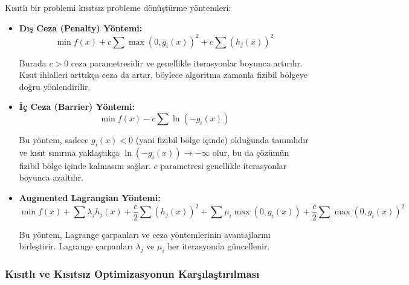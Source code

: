 \begin{tcolorbox}[title=Kısıtların Ele Alınması]
Kısıtlı bir problemi kısıtsız probleme dönüştürme yöntemleri:

\begin{itemize}
    \item \textbf{Dış Ceza (Penalty) Yöntemi:} 
    \begin{equation}
    \min f(x) + c\sum\max(0,g_i(x))^2 + c\sum(h_j(x))^2
    \end{equation}
    
    Burada $c > 0$ ceza parametresidir ve genellikle iterasyonlar boyunca artırılır. Kısıt ihlalleri arttıkça ceza da artar, böylece algoritma zamanla fizibil bölgeye doğru yönlendirilir.
    
    \item \textbf{İç Ceza (Barrier) Yöntemi:} 
    \begin{equation}
    \min f(x) - c\sum\ln(-g_i(x))
    \end{equation}
    
    Bu yöntem, sadece $g_i(x) < 0$ (yani fizibil bölge içinde) olduğunda tanımlıdır ve kısıt sınırına yaklaştıkça $\ln(-g_i(x)) \to -\infty$ olur, bu da çözümün fizibil bölge içinde kalmasını sağlar. $c$ parametresi genellikle iterasyonlar boyunca azaltılır.
    
    \item \textbf{Augmented Lagrangian Yöntemi:} 
    \begin{equation}
    \min f(x) + \sum\lambda_j h_j(x) + \frac{c}{2}\sum(h_j(x))^2 + \sum\mu_i\max(0,g_i(x)) + \frac{c}{2}\sum\max(0,g_i(x))^2
    \end{equation}
    
    Bu yöntem, Lagrange çarpanları ve ceza yöntemlerinin avantajlarını birleştirir. Lagrange çarpanları $\lambda_j$ ve $\mu_i$ her iterasyonda güncellenir.
\end{itemize}
\end{tcolorbox}

\subsubsection{Kısıtlı ve Kısıtsız Optimizasyonun Karşılaştırılması}

